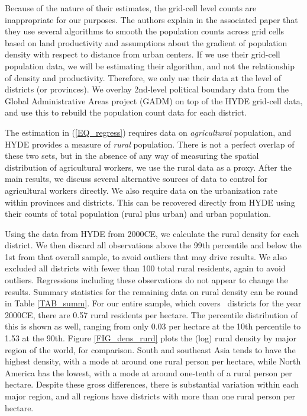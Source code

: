 \documentclass[11pt]{article}
\begin{document}
Because of the nature of their estimates, the grid-cell level counts are inappropriate for our purposes. The authors explain in the associated paper that they use several algorithms to smooth the population counts across grid cells based on land productivity and assumptions about the gradient of population density with respect to distance from urban centers. If we use their grid-cell population data, we will be estimating their algorithm, and not the relationship of density and productivity. Therefore, we only use their data at the level of districts (or provinces). We overlay 2nd-level political boundary data from the Global Administrative Areas project (GADM) on top of the HYDE grid-cell data, and use this to rebuild the population count data for each district.

The estimation in (\ref{EQ_regress}) requires data on \textit{agricultural} population, and HYDE provides a measure of \textit{rural} population. There is not a perfect overlap of these two sets, but in the absence of any way of measuring the spatial distribution of agricultural workers, we use the rural data as a proxy. After the main results, we discuss several alternative sources of data to control for agricultural workers directly. We also require data on the urbanization rate within provinces and districts. This can be recovered directly from HYDE using their counts of total population (rural plus urban) and urban population.

Using the data from HYDE from 2000CE, we calculate the rural density for each district. We then discard all observations above the 99th percentile and below the 1st from that overall sample, to avoid outliers that may drive results. We also excluded all districts with fewer than 100 total rural residents, again to avoid outliers. Regressions including these observations do not appear to change the results. Summary statistics for the remaining data on rural density can be round in Table \ref{TAB_summ}. For our entire sample, which covers \districts \ districts for the year 2000CE, there are 0.57 rural residents per hectare. The percentile distribution of this is shown as well, ranging from only 0.03 per hectare at the 10th percentile to 1.53 at the 90th. Figure \ref{FIG_dens_rurd} plots the (log) rural density by major region of the world, for comparison. South and southeast Asia tends to have the highest density, with a mode at around one rural person per hectare, while North America has the lowest, with a mode at around one-tenth of a rural person per hectare. Despite these gross differences, there is substantial variation within each major region, and all regions have districts with more than one rural person per hectare. 
\end{document}
